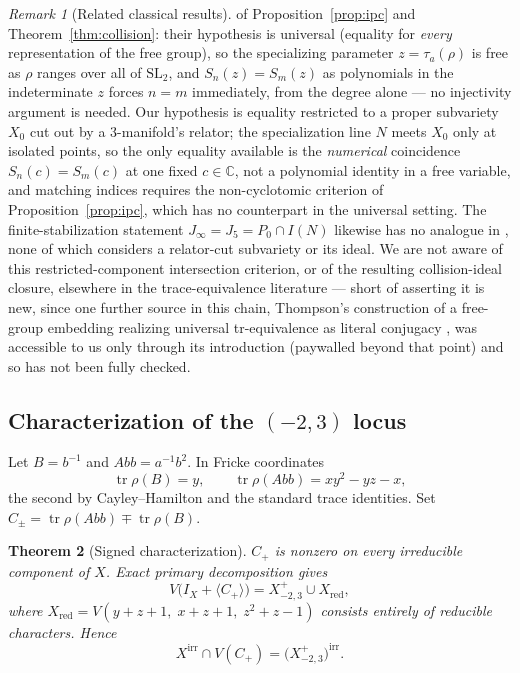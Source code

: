 \documentclass[11pt,a4paper]{article}
\newtheorem{theorem}{Theorem}[section]
\theoremstyle{definition}
\theoremstyle{remark}
\newtheorem{remark}[theorem]{Remark}
\newcommand{\tr}{\operatorname{tr}}
\begin{document}
\begin{remark}[Related classical results]
of Proposition~\ref{prop:ipc} and Theorem~\ref{thm:collision}: their
hypothesis is universal (equality for \emph{every} representation of the
free group), so the specializing parameter $z=\tau_a(\rho)$ is free as
$\rho$ ranges over all of $\mathrm{SL}_2$, and $S_n(z)=S_m(z)$ as
polynomials in the indeterminate $z$ forces $n=m$ immediately, from the
degree alone --- no injectivity argument is needed. Our hypothesis is
equality restricted to a proper subvariety $X_0$ cut out by a
$3$-manifold's relator; the specialization line $N$ meets $X_0$ only at
isolated points, so the only equality available is the \emph{numerical}
coincidence $S_n(c)=S_m(c)$ at one fixed $c\in\mathbb C$, not a polynomial
identity in a free variable, and matching indices requires the
non-cyclotomic criterion of Proposition~\ref{prop:ipc}, which has no
counterpart in the universal setting. The finite-stabilization statement
$J_\infty=J_5=P_0\cap I(N)$ likewise has no analogue in
\cite{Horowitz1972,Southcott1979,GinzburgRudnick1998,Wang2007}, none of
which considers a relator-cut subvariety or its ideal. We are not aware
of this restricted-component intersection criterion, or of the resulting
collision-ideal closure, elsewhere in the trace-equivalence literature ---
short of asserting it is new, since one further source in this chain,
Thompson's construction of a free-group embedding realizing universal
tr-equivalence as literal conjugacy \cite{Thompson1989}, was accessible to
us only through its introduction (paywalled beyond that point) and so has
not been fully checked.
\end{remark}

\subsection{Characterization of the $(-2,3)$ locus}

Let $B = b^{-1}$ and $Abb = a^{-1}b^2$. In Fricke coordinates
\begin{equation}
\tr\rho(B) = y, \qquad
\tr\rho(Abb) = xy^2 - yz - x,
\end{equation}
the second by Cayley--Hamilton and the standard trace identities.
Set $C_\pm = \tr\rho(Abb) \mp \tr\rho(B)$.

\begin{theorem}[Signed characterization]
\label{thm:signed}
$C_+$ is nonzero on every irreducible component of $X$. Exact primary
decomposition gives
\begin{equation}
V\bigl(I_X + \langle C_+ \rangle\bigr)
= X^{+}_{-2,3} \cup X_{\mathrm{red}},
\end{equation}
where $X_{\mathrm{red}} = V(y+z+1,\; x+z+1,\; z^2+z-1)$ consists
entirely of reducible characters. Hence
\begin{equation}
X^{\mathrm{irr}} \cap V(C_+) = \bigl(X^{+}_{-2,3}\bigr)^{\mathrm{irr}} .
\end{equation}
\end{theorem}
\end{document}
